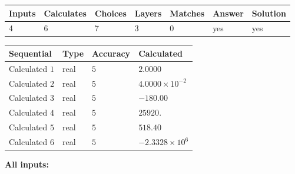 \documentclass[12pt]{article}
\begin{document}
 
 
\noindent{}
 
 

 
\vspace{0.3in}
   
   
   
   
\noindent\begin{tabular}{|l|l|l|l|l|l|l|}
 \hline
Inputs & Calculates & Choices & Layers & Matches & Answer & Solution \\ \hline
           4 & 
           6 & 
           7
  & 
           3 & 
           0 & 
  yes & 
  yes 
  \\ \hline
 \end{tabular}
   
   
   
   
\noindent{}
   
   
  
  
\noindent\begin{tabular}{|l|l|l|l|}
\hline
 Sequential & Type & Accuracy & Calculated \\ 
\hline
 
 
  Calculated $           1$ & real & $           5 $ & 
 $ 2.0000 $ 
 \\  \hline  
 
 
  Calculated $           2$ & real & $           5 $ & 
 $ 4.0000 \times 10^{-2} $ 
 \\  \hline  
 
 
  Calculated $           3$ & real & $           5 $ & 
 $ -180.00 $ 
 \\  \hline  
 
 
  Calculated $           4$ & real & $           5 $ & 
 $ 25920. $ 
 \\  \hline  
 
 
  Calculated $           5$ & real & $           5 $ & 
 $ 518.40 $ 
 \\  \hline  
 
 
  Calculated $           6$ & real & $           5 $ & 
 $ -2.3328 \times 10^{6} $ 
 \\  \hline  
 \end{tabular}
   
   
   
   
\noindent\vspace{0.1in}\hspace{-0.08in} {\textbf{\Large{All inputs: }}}
   
\end{document}
